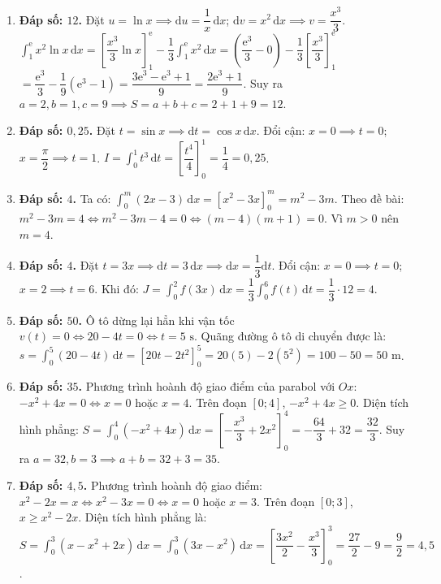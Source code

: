 \documentclass[12pt,a4paper]{article}
\begin{document}
\begin{enumerate}[start=16]
\item \textbf{Đáp số: $12$.}  
Đặt $u = \ln x \implies \mathrm{d}u = \dfrac{1}{x}\,\mathrm{d}x$; $\mathrm{d}v = x^2\,\mathrm{d}x \implies v = \dfrac{x^3}{3}$.  
$\int_1^{\mathrm{e}} x^2 \ln x\,\mathrm{d}x = \left[ \dfrac{x^3}{3}\ln x \right]_1^{\mathrm{e}} - \dfrac{1}{3}\int_1^{\mathrm{e}} x^2\,\mathrm{d}x = \left(\dfrac{\mathrm{e}^3}{3} - 0\right) - \dfrac{1}{3}\left[ \dfrac{x^3}{3} \right]_1^{\mathrm{e}}$  
$= \dfrac{\mathrm{e}^3}{3} - \dfrac{1}{9}(\mathrm{e}^3 - 1) = \dfrac{3\mathrm{e}^3 - \mathrm{e}^3 + 1}{9} = \dfrac{2\mathrm{e}^3 + 1}{9}$.  
Suy ra $a = 2, b = 1, c = 9 \implies S = a + b + c = 2 + 1 + 9 = 12$.

\item \textbf{Đáp số: $0{,}25$.}  
Đặt $t = \sin x \implies \mathrm{d}t = \cos x\,\mathrm{d}x$.  
Đổi cận: $x = 0 \implies t = 0$; $x = \dfrac{\pi}{2} \implies t = 1$.  
$I = \int_0^1 t^3\,\mathrm{d}t = \left[ \dfrac{t^4}{4} \right]_0^1 = \dfrac{1}{4} = 0{,}25$.

\item \textbf{Đáp số: $4$.}  
Ta có: $\int_0^m (2x - 3)\,\mathrm{d}x = \left[ x^2 - 3x \right]_0^m = m^2 - 3m$.  
Theo đề bài: $m^2 - 3m = 4 \iff m^2 - 3m - 4 = 0 \iff (m - 4)(m + 1) = 0$.  
Vì $m > 0$ nên $m = 4$.

\item \textbf{Đáp số: $4$.}  
Đặt $t = 3x \implies \mathrm{d}t = 3\,\mathrm{d}x \implies \mathrm{d}x = \dfrac{1}{3}\mathrm{d}t$.  
Đổi cận: $x = 0 \implies t = 0$; $x = 2 \implies t = 6$.  
Khi đó: $J = \int_0^2 f(3x)\,\mathrm{d}x = \dfrac{1}{3}\int_0^6 f(t)\,\mathrm{d}t = \dfrac{1}{3} \cdot 12 = 4$.

\item \textbf{Đáp số: $50$.}  
Ô tô dừng lại hẳn khi vận tốc $v(t) = 0 \iff 20 - 4t = 0 \iff t = 5\text{ s}$.  
Quãng đường ô tô di chuyển được là:  
$s = \int_0^5 (20 - 4t)\,\mathrm{d}t = \left[ 20t - 2t^2 \right]_0^5 = 20(5) - 2(5^2) = 100 - 50 = 50\text{ m}$.

\item \textbf{Đáp số: $35$.}  
Phương trình hoành độ giao điểm của parabol với $Ox$: $-x^2 + 4x = 0 \iff x = 0$ hoặc $x = 4$.  
Trên đoạn $[0; 4]$, $-x^2 + 4x \ge 0$.  
Diện tích hình phẳng:  
$S = \int_0^4 (-x^2 + 4x)\,\mathrm{d}x = \left[ -\dfrac{x^3}{3} + 2x^2 \right]_0^4 = -\dfrac{64}{3} + 32 = \dfrac{32}{3}$.  
Suy ra $a = 32, b = 3 \implies a + b = 32 + 3 = 35$.

\item \textbf{Đáp số: $4{,}5$.}  
Phương trình hoành độ giao điểm: $x^2 - 2x = x \iff x^2 - 3x = 0 \iff x = 0$ hoặc $x = 3$.  
Trên đoạn $[0; 3]$, $x \ge x^2 - 2x$.  
Diện tích hình phẳng là:  
$S = \int_0^3 (x - x^2 + 2x)\,\mathrm{d}x = \int_0^3 (3x - x^2)\,\mathrm{d}x = \left[ \dfrac{3x^2}{2} - \dfrac{x^3}{3} \right]_0^3 = \dfrac{27}{2} - 9 = \dfrac{9}{2} = 4{,}5$.


\end{enumerate}
\end{document}
